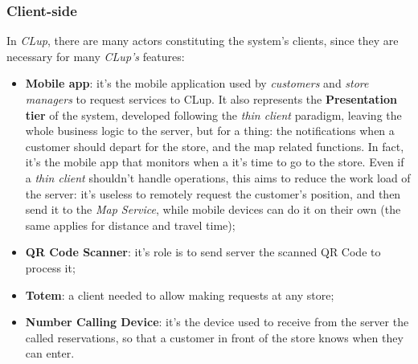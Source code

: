\documentclass{article}
\begin{document}
	\subsubsection{Client-side}
	In \emph{CLup}, there are many actors constituting the system's clients, since they are necessary for many \emph{CLup's} features:
	\begin{itemize}
		\item {\bfseries Mobile app}: it's the mobile application used by \emph{customers} and \emph{store managers} to request services to CLup. It also represents the {\bfseries Presentation tier} of the system, developed following the \emph{thin client} paradigm, leaving the whole business logic to the server, but for a thing: the notifications when a customer should depart for the store, and the map related functions. In fact, it's the mobile app that monitors when a it's time to go to the store. Even if a \emph{thin client} shouldn't handle operations, this aims to reduce the work load of the server: it's useless to remotely request the customer's position, and then send it to the \emph{Map Service}, while mobile devices can do it on their own (the same applies for distance and travel time);
		\item{\bfseries QR Code Scanner}: it's role is to send server the scanned QR Code to process it;
		\item{\bfseries Totem}: a client needed to allow making requests at any store;
		\item{\bfseries Number Calling Device}: it's the device used to receive from the server the called reservations, so that a customer in front of the store knows when they can enter.  
	\end{itemize}
\end{document}
